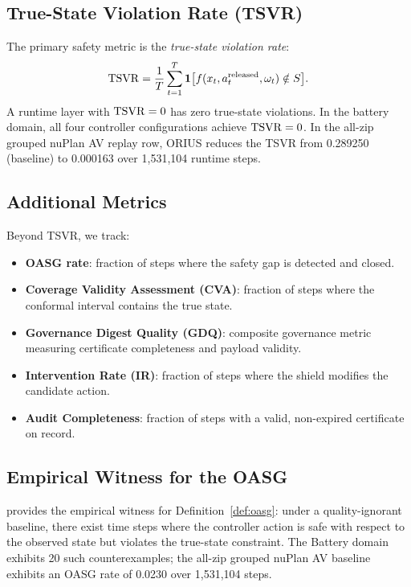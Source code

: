 \subsection{True-State Violation Rate (TSVR)}

The primary safety metric is the \emph{true-state violation rate}:
\begin{equation}\label{eq:tsvr}
  \mathrm{TSVR} = \frac{1}{T}\sum_{t=1}^{T} \mathbf{1}\bigl[f(x_t, a_t^{\mathrm{released}}, \omega_t) \notin S\bigr].
\end{equation}
A runtime layer with $\mathrm{TSVR} = 0$ has zero true-state violations.  In the battery
domain, all four controller configurations achieve $\mathrm{TSVR} = 0$.  In the all-zip
grouped nuPlan AV replay row, ORIUS reduces the TSVR from 0.289250 (baseline) to
0.000163 over 1{,}531{,}104 runtime steps.

\subsection{Additional Metrics}

Beyond TSVR, we track:
\begin{itemize}[nosep]
  \item \textbf{OASG rate}: fraction of steps where the safety gap is detected and
        closed.
  \item \textbf{Coverage Validity Assessment (CVA)}: fraction of steps where the
        conformal interval contains the true state.
  \item \textbf{Governance Digest Quality (GDQ)}: composite governance metric measuring
        certificate completeness and payload validity.
  \item \textbf{Intervention Rate (IR)}: fraction of steps where the shield modifies
        the candidate action.
  \item \textbf{Audit Completeness}: fraction of steps with a valid, non-expired
        certificate on record.
\end{itemize}

\subsection{Empirical Witness for the OASG}\label{sec:oasg_witness}

 provides the empirical witness for Definition~\ref{def:oasg}:
under a quality-ignorant baseline, there exist time steps where the controller
action is safe with respect to the observed state but violates the true-state
constraint.  The Battery domain exhibits 20 such counterexamples; the all-zip
grouped nuPlan AV baseline exhibits an OASG rate of 0.0230 over 1{,}531{,}104
steps.

